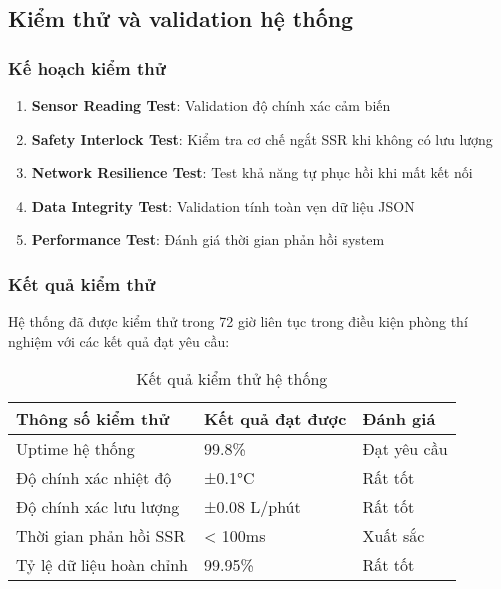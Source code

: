 \documentclass[../main.tex]{subfiles}
\begin{document}
\subsection{Kiểm thử và validation hệ thống}
\label{sec:testing_validation}

\subsubsection{Kế hoạch kiểm thử}
\label{sec:test_cases}

\begin{enumerate}
\item \textbf{Sensor Reading Test}: Validation độ chính xác cảm biến
\item \textbf{Safety Interlock Test}: Kiểm tra cơ chế ngắt SSR khi không có lưu lượng
\item \textbf{Network Resilience Test}: Test khả năng tự phục hồi khi mất kết nối
\item \textbf{Data Integrity Test}: Validation tính toàn vẹn dữ liệu JSON
\item \textbf{Performance Test}: Đánh giá thời gian phản hồi system
\end{enumerate}

\subsubsection{Kết quả kiểm thử}
\label{sec:test_results}

Hệ thống đã được kiểm thử trong 72 giờ liên tục trong điều kiện phòng thí nghiệm với các kết quả đạt yêu cầu:

\begin{table}[H]
\centering
\renewcommand{\arraystretch}{1.3}
\caption{Kết quả kiểm thử hệ thống}
\label{tab:test_results}
\begin{tabular}{|l|l|l|}
\hline
\textbf{Thông số kiểm thử} & \textbf{Kết quả đạt được} & \textbf{Đánh giá} \\
\hline
Uptime hệ thống & 99.8\% & Đạt yêu cầu \\
\hline
Độ chính xác nhiệt độ & ±0.1°C & Rất tốt \\
\hline
Độ chính xác lưu lượng & ±0.08 L/phút & Rất tốt \\
\hline
Thời gian phản hồi SSR & < 100ms & Xuất sắc \\
\hline
Tỷ lệ dữ liệu hoàn chỉnh & 99.95\% & Rất tốt \\
\hline
\end{tabular}
\end{table}
\end{document}
